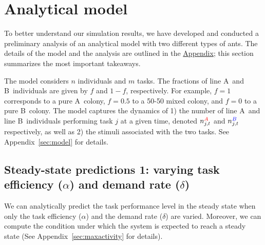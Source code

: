 \documentclass[11pt]{article}
\newcommand{\A}{{\color{red}A}}
\newcommand{\B}{{\color{blue}B}}
\begin{document}
\section{Analytical model} \label{sec:analytical}

To better understand our simulation results, we have developed and conducted a preliminary analysis of an analytical model with two different types of ants.  The details of the model and the analysis are outlined in the \hyperref[sec:appendix]{Appendix}; this section summarizes the most important takeaways.

The model considers $n$ individuals and $m$ tasks. The fractions of line \A\ and \B\ individuals are given by $f$ and $1-f$, respectively. For example, $f=1$ corresponds to a pure \A\ colony, $f = 0.5$ to a 50-50 mixed colony, and $f = 0$ to a pure \B\ colony. 
The model captures the dynamics of 1) the number of line \A\ and line \B\ individuals performing task $j$ at a given time, denoted $n_{j,t}^{\A}$ and $n_{j,t}^{\B}$ respectively, as well as 2) the stimuli associated with the two tasks. See Appendix~\ref{sec:model} for details.

\subsection{Steady-state predictions 1: varying task efficiency ($\alpha$) and demand rate ($\delta$)} \label{sec:sspred1}
We can analytically predict the task performance level in the steady state when only the task efficiency ($\alpha$) and the demand rate ($\delta$) are varied. Moreover, we can compute the condition under which the system is expected to reach a steady state (See Appendix~\ref{sec:maxactivity} for details). 
\end{document}
